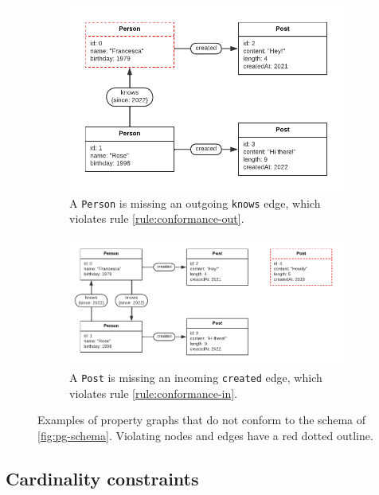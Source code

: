 \documentclass{article}
\begin{document}
\begin{figure}[t]
  \begin{subfigure}[t]{0.45\textwidth}
    \centering
    \includegraphics[width=\textwidth]{figures/conformance-out-2.pdf}
    \caption{A \texttt{Person} is missing an outgoing \texttt{knows} edge, which violates rule \ref{rule:conformance-out}.}
    \label{fig:conformance-out-2}
  \end{subfigure}
  \hfill
  \begin{subfigure}[t]{0.45\textwidth}
    \centering
    \includegraphics[width=\textwidth]{figures/conformance-in.pdf}
    \caption{A \texttt{Post} is missing an incoming \texttt{created} edge, which violates rule \ref{rule:conformance-in}.}
    \label{fig:conformance-in}
  \end{subfigure}

  \caption{Examples of property graphs that do not conform to the schema of \autoref{fig:pg-schema}. Violating nodes and edges have a red dotted outline.}
  \label{fig:conformance}
\end{figure}

\subsection{Cardinality constraints}
\end{document}
